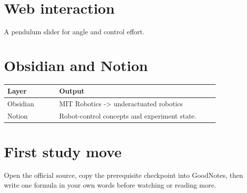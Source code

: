 \documentclass[11pt]{article}
\begin{document}
\section*{Web interaction}
A pendulum slider for angle and control effort.

\section*{Obsidian and Notion}
\begin{tabular}{p{0.22\linewidth}p{0.68\linewidth}}
\toprule
Layer & Output \\
\midrule
Obsidian & MIT Robotics -> underactuated robotics \\
Notion & Robot-control concepts and experiment state. \\
\bottomrule
\end{tabular}

\section*{First study move}
Open the official source, copy the prerequisite checkpoint into GoodNotes, then write one formula in your own words before watching or reading more.
\end{document}
